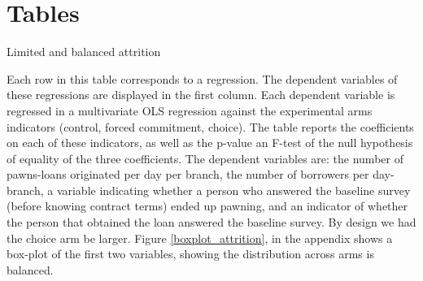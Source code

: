 \documentclass[oneside,11pt]{article}
\begin{document}



\newpage


\clearpage

%
%






\newpage
\singlespacing

\section{Tables}

\begin{table}[H]
\caption{Limited and balanced attrition}
\label{attrition_table}
\begin{center}
\scriptsize{}
\end{center}
 \scriptsize Each row in this table 
 corresponds to a regression. The dependent variables of these regressions are displayed in the first column. Each dependent variable is regressed in a multivariate OLS regression against the experimental arms indicators (control, forced commitment, choice). The table reports the coefficients on each of these indicators, as well as the p-value an F-test of the null hypothesis of equality of the three coefficients. The dependent variables are: the number of pawns-loans originated per day per branch, the number of borrowers per day-branch, a variable indicating whether a person who answered the baseline survey (before knowing contract terms) ended up pawning, and an indicator of whether the person that obtained the loan answered the baseline survey. By design we had the choice arm be larger. Figure \ref{boxplot_attrition}, in the appendix shows a box-plot of the first two variables, showing the distribution across arms is balanced.
\end{table}
\end{document}
